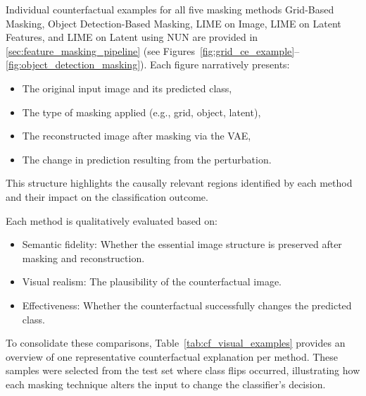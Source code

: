 Individual counterfactual examples for all five masking methods Grid-Based Masking, Object Detection-Based Masking, LIME on Image, LIME on Latent Features, and LIME on Latent using NUN are provided in \cref{sec:feature_masking_pipeline} (see Figures~\ref{fig:grid_ce_example}--\ref{fig:object_detection_masking}). Each figure narratively presents:

\begin{itemize}
    \item The original input image and its predicted class,
    \item The type of masking applied (e.g., grid, object, latent),
    \item The reconstructed image after masking via the VAE,
    \item The change in prediction resulting from the perturbation.
\end{itemize}

This structure highlights the causally relevant regions identified by each method and their impact on the classification outcome.

Each method is qualitatively evaluated based on:
\begin{itemize}
    \item Semantic fidelity: Whether the essential image structure is preserved after masking and reconstruction.
    \item Visual realism: The plausibility of the counterfactual image.
    \item Effectiveness: Whether the counterfactual successfully changes the predicted class.
\end{itemize}

\vspace{0.5em}

To consolidate these comparisons, Table~\ref{tab:cf_visual_examples} provides an overview of one representative counterfactual explanation per method. These samples were selected from the test set where class flips occurred, illustrating how each masking technique alters the input to change the classifier's decision.

